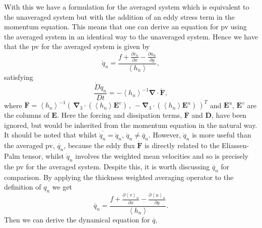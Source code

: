 \documentclass[10pt,a4paper]{report}
\newcommand*\thkmean[1]{\overline{#1}}
\newcommand*\nthkmean[1]{\left\langle{#1}\right\rangle}
\newcommand*\spec[1]{\mathring{#1}}
\newcommand*{\partialdiff}[2][{}]{\frac{\partial #1}{\partial #2}}
\begin{document}
    With this we have a formulation for the 
    averaged system which is equivalent to the
    unaveraged system but with the addition of an
    eddy stress term in the momentum equation.
    This means that one can derive an equation for \gls{pv} using the averaged system
    in an identical way to the unaveraged 
    system. Hence we have that the \gls{pv} for
    the averaged system is given by 
    \begin{equation}
    \spec{q}_{n} =
    \frac{f+\partialdiff[\thkmean{v}_{n}]{x}-\partialdiff[\thkmean{u}_{n}]{y}}
    {\nthkmean{h_{n}}},
    \end{equation} 
    satisfying
    \begin{equation}
    \frac{\spec{D}\spec{q}_{n}}{D t} 
    =   -\nthkmean{h_{n}}^{-1}
    \boldsymbol{\nabla}
    \cdot\boldsymbol{\spec{F}},
    \label{avpveq}
    \end{equation} 
    where $
    \boldsymbol{\spec{F}}
    =   \nthkmean{h_{n}}^{-1}\left( \,
    \boldsymbol{\nabla}_{3}
    \cdot(\nthkmean{h_{n}}
    \boldsymbol{E}^{v}) \, , \,
    - \boldsymbol{\nabla}_{3}
    \cdot(\nthkmean{h_{n}}
    \boldsymbol{E}^{u}) \, \right)^{T}  $ and $\boldsymbol{E}^{u}$,  $\boldsymbol{E}^{v}$ are the
    columns of  $\boldsymbol{E}$. Here the forcing and dissipation terms, $\thkmean{
    	\boldsymbol{F}}$ and $\thkmean{
    	\boldsymbol{D}}$, have been ignored, but
    would be inherited from the momentum
    equation in the natural way. It should be noted that whilst $\thkmean{\spec{q}_{n}} = \spec{q}_{n}$, $\spec{q}_{n} \neq \thkmean{q}_{n}$.  However,
    $\spec{q}_{n}$ is 
    more useful than the averaged \gls{pv}, $\thkmean{q}_{n}$, because the eddy flux $
    \boldsymbol{\spec{F}} $ is directly related to the Eliassen-Palm tensor, whilst  $\spec{q}_{n}$ involves
    the weighted mean velocities and so is precisely the \gls{pv} for the averaged system. 
    Despite this, it is worth discussing $\thkmean{q}_{n}$ for 
    comparison. By applying the thickness weighted averaging operator to the 
    definition of $q_{n}$ we get 
    \begin{equation}
    \thkmean{q}_{n} =
    \frac{f+\partialdiff[\nthkmean{v}_{n}]{x}-\partialdiff[\nthkmean{u}_{n}]{y}}
    {\nthkmean{h_{n}}}.
    \end{equation} 
    Then we can derive the dynamical equation for
    $ \thkmean{q}$,
\end{document}
